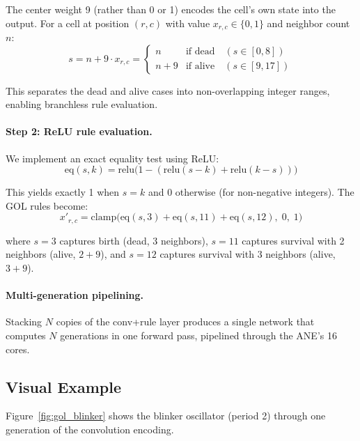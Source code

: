 \documentclass[11pt,twocolumn]{article}
\begin{document}
The center weight 9 (rather than 0 or 1) encodes the cell's own state
into the output. For a cell at position $(r,c)$ with value $x_{r,c}
\in \{0,1\}$ and neighbor count $n$:
\begin{equation}
s = n + 9 \cdot x_{r,c} =
\begin{cases}
n       & \text{if dead}   \quad (s \in [0,8]) \\
n + 9   & \text{if alive}  \quad (s \in [9,17])
\end{cases}
\end{equation}

This separates the dead and alive cases into non-overlapping integer
ranges, enabling branchless rule evaluation.

\paragraph{Step 2: ReLU rule evaluation.} We implement an exact
equality test using ReLU:
\begin{equation}
\mathrm{eq}(s, k) = \mathrm{relu}\!\big(1 - (\mathrm{relu}(s-k) + \mathrm{relu}(k-s))\big)
\label{eq:relu_eq}
\end{equation}

This yields exactly 1 when $s = k$ and 0 otherwise (for non-negative
integers). The GOL rules become:
\begin{equation}
x'_{r,c} = \mathrm{clamp}\!\big(\mathrm{eq}(s, 3) + \mathrm{eq}(s, 11) + \mathrm{eq}(s, 12),\; 0,\; 1\big)
\label{eq:gol_rule}
\end{equation}

where $s=3$ captures birth (dead, 3 neighbors), $s=11$ captures
survival with 2 neighbors (alive, $2+9$), and $s=12$ captures
survival with 3 neighbors (alive, $3+9$).

\paragraph{Multi-generation pipelining.} Stacking $N$ copies of the
conv+rule layer produces a single network that computes $N$
generations in one forward pass, pipelined through the ANE's 16 cores.

\subsection{Visual Example}

Figure~\ref{fig:gol_blinker} shows the blinker oscillator (period 2)
through one generation of the convolution encoding.
\end{document}
